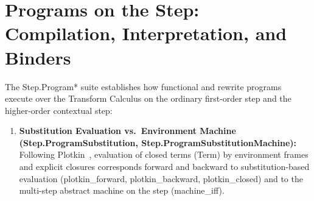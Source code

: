 \documentclass[11pt,a4paper]{article}
\theoremstyle{definition}
\DeclareRobustCommand{\lean}[1]{%
  \ifmmode\text{\normalfont\ttfamily\footnotesize\detokenize{#1}}%
  \else{\normalfont\footnotesize\leanurl{#1}}\fi}
\def\lean#1{#1}%
\begin{document}
\section{Programs on the Step: Compilation, Interpretation, and Binders}
\label{sec:programs}

The \lean{Step.Program*} suite establishes how functional and rewrite programs execute over the Transform Calculus on the ordinary first-order step and the higher-order contextual step:

\begin{enumerate}[leftmargin=2em, nosep]
  \item \textbf{Substitution Evaluation vs.\ Environment Machine (\lean{Step.ProgramSubstitution}, \lean{Step.ProgramSubstitutionMachine}):}
  Following Plotkin~\cite{Plotkin1975CallByName}, evaluation of closed terms (\lean{Term}) by environment frames and explicit closures corresponds forward and backward to substitution-based evaluation (\lean{plotkin_forward}, \lean{plotkin_backward}, \lean{plotkin_closed}) and to the multi-step abstract machine on the step (\lean{machine_iff}).


\end{enumerate}
\end{document}
